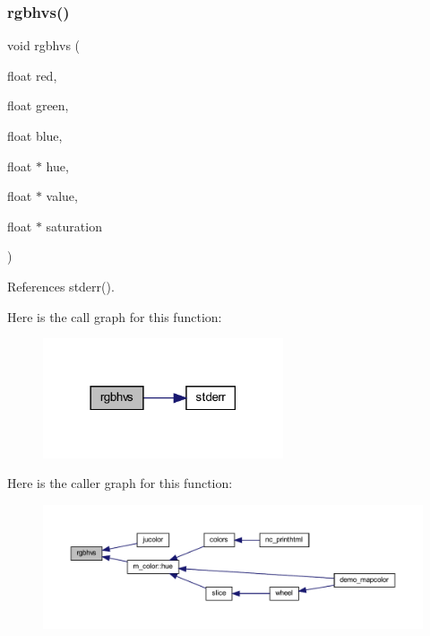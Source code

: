 \subsubsection{\texorpdfstring{rgbhvs()}{rgbhvs()}}
{\footnotesize\ttfamily void rgbhvs (\begin{DoxyParamCaption}\item[{float}]{red,  }\item[{float}]{green,  }\item[{float}]{blue,  }\item[{float $\ast$}]{hue,  }\item[{float $\ast$}]{value,  }\item[{float $\ast$}]{saturation }\end{DoxyParamCaption})}



References stderr().

Here is the call graph for this function\+:
\nopagebreak
\begin{figure}[H]
\begin{center}
\leavevmode
\includegraphics[width=201pt]{C-rgbhvs_8c_a4110202639bfb2a997338ea37775dca8_cgraph}
\end{center}
\end{figure}
Here is the caller graph for this function\+:
\nopagebreak
\begin{figure}[H]
\begin{center}
\leavevmode
\includegraphics[width=350pt]{C-rgbhvs_8c_a4110202639bfb2a997338ea37775dca8_icgraph}
\end{center}
\end{figure}
